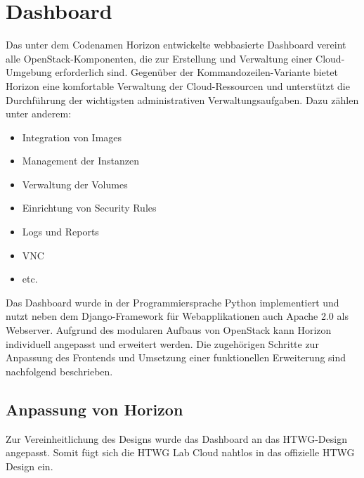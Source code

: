 \section{Dashboard}

Das unter dem Codenamen Horizon entwickelte webbasierte Dashboard vereint alle OpenStack-Komponenten, die zur Erstellung und Verwaltung einer Cloud-Umgebung erforderlich sind. Gegenüber der Kommandozeilen-Variante bietet Horizon eine komfortable Verwaltung der Cloud-Ressourcen und unterstützt die Durchführung der wichtigsten administrativen Verwaltungsaufgaben. Dazu zählen unter anderem:
\begin{itemize}
\item Integration von Images
\item Management der Instanzen
\item Verwaltung der Volumes
\item Einrichtung von Security Rules
\item Logs und Reports
\item VNC
\item etc.
\end{itemize}
Das Dashboard wurde in der Programmiersprache Python implementiert und nutzt neben dem Django-Framework für Webapplikationen auch Apache 2.0 als Webserver. Aufgrund des modularen Aufbaus von OpenStack kann Horizon individuell angepasst und erweitert werden. Die zugehörigen Schritte zur Anpassung des Frontends und Umsetzung einer funktionellen Erweiterung sind nachfolgend beschrieben.

\subsection{Anpassung von Horizon}

Zur Vereinheitlichung des Designs wurde das Dashboard an das HTWG-Design angepasst. Somit fügt sich die HTWG Lab Cloud nahtlos in das offizielle HTWG Design ein.

